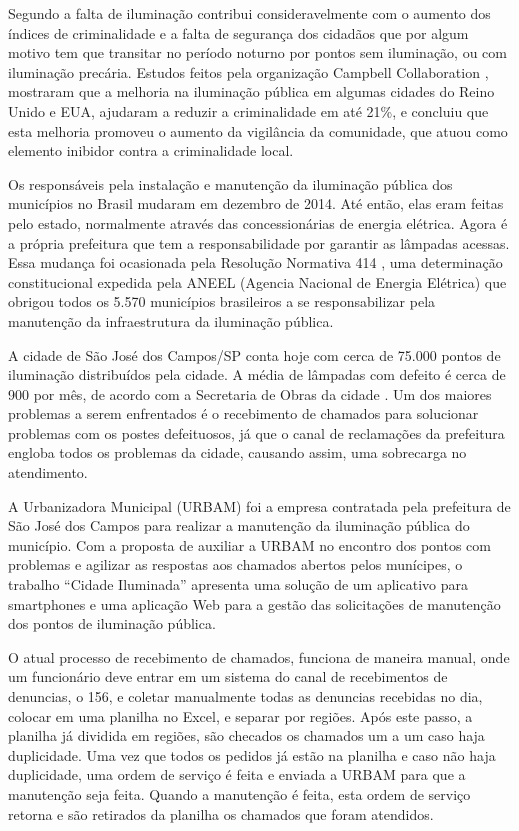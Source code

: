 \documentclass[
	article,			%
	11pt,				%
	oneside,			%
	a4paper,			%
	english,			%
	brazil,				%
	sumario=tradicional
	]{abntex2}
\begin{document}
Segundo \cite{aver} a falta de iluminação contribui consideravelmente com o aumento dos índices de criminalidade e a falta de segurança dos cidadãos que por algum motivo tem que transitar no período noturno por pontos sem iluminação, ou com iluminação precária.
Estudos feitos pela organização Campbell Collaboration \cite{newton}, mostraram que a melhoria na iluminação pública em algumas cidades do Reino Unido e EUA, ajudaram a reduzir a criminalidade em até 21\%, e concluiu que esta melhoria promoveu o aumento da vigilância da comunidade, que atuou como elemento inibidor contra a criminalidade local.

Os responsáveis pela instalação e manutenção da iluminação pública dos municípios no Brasil mudaram em dezembro de 2014.
Até então, elas eram feitas pelo estado, normalmente através das concessionárias de energia elétrica.
Agora é a própria prefeitura que tem a responsabilidade por garantir as lâmpadas acessas.
Essa mudança foi ocasionada pela Resolução Normativa 414 \cite{aneel414}, uma determinação constitucional expedida pela ANEEL (Agencia Nacional de Energia Elétrica) que obrigou todos os 5.570 municípios brasileiros a se responsabilizar pela manutenção da infraestrutura da iluminação pública.

A cidade de São José dos Campos/SP conta hoje com cerca de 75.000 pontos de iluminação distribuídos pela cidade.
A média de lâmpadas com defeito é cerca de 900 por mês, de acordo com a Secretaria de Obras da cidade \cite{secretariaobras}.
Um dos maiores problemas a serem enfrentados é o recebimento de chamados para solucionar problemas com os postes defeituosos, já que o canal de reclamações da prefeitura engloba todos os problemas da cidade, causando assim, uma sobrecarga no atendimento.

A Urbanizadora Municipal (URBAM) foi a empresa contratada pela prefeitura de São José dos Campos para realizar a manutenção da iluminação pública do município.
Com a proposta de auxiliar a URBAM no encontro dos pontos com problemas e agilizar as respostas aos chamados abertos pelos munícipes, o trabalho “Cidade Iluminada” apresenta uma solução de um aplicativo para smartphones e uma aplicação Web para a gestão das solicitações de manutenção dos pontos de iluminação pública.

O atual processo de recebimento de chamados, funciona de maneira manual, onde um funcionário deve entrar em um sistema do canal de recebimentos de denuncias, o 156, e coletar manualmente todas as denuncias recebidas no dia, colocar em uma planilha no Excel, e separar por regiões.
Após este passo, a planilha já dividida em regiões, são checados os chamados um a um caso haja duplicidade.
Uma vez que todos os pedidos já estão na planilha e caso não haja duplicidade, uma ordem de serviço é feita e enviada a URBAM para que a manutenção seja feita.
Quando a manutenção é feita, esta ordem de serviço retorna e são retirados da planilha os chamados que foram atendidos.
\end{document}
